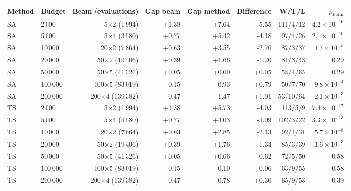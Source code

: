 \begin{tabular}{llrrrrrr}
\toprule
Method & Budget & Beam (evaluations) & Gap beam & Gap method & Difference & W/T/L & $p_{\mathrm{Holm}}$ \\
\midrule
SA & 2\,000 & 5$\times$2 (1\,994) & +1.38 & +7.64 & -5.55 & 111/4/12 & $4.2 \times 10^{-16}$ \\
SA & 5\,000 & 5$\times$4 (3\,580) & +0.77 & +5.42 & -4.18 & 97/4/26 & $2.1 \times 10^{-10}$ \\
SA & 10\,000 & 20$\times$2 (7\,864) & +0.63 & +3.55 & -2.70 & 87/3/37 & $1.7 \times 10^{-5}$ \\
SA & 20\,000 & 50$\times$2 (19\,406) & +0.39 & +1.66 & -1.20 & 81/3/43 & 0.29 \\
SA & 50\,000 & 50$\times$5 (41\,326) & +0.05 & +0.00 & +0.05 & 58/4/65 & 0.29 \\
SA & 100\,000 & 100$\times$5 (83\,019) & -0.15 & -0.93 & +0.79 & 50/7/70 & $9.8 \times 10^{-4}$ \\
SA & 200\,000 & 200$\times$4 (139\,382) & -0.47 & -1.47 & +1.01 & 53/10/64 & $2.1 \times 10^{-3}$ \\
\midrule
TS & 2\,000 & 5$\times$2 (1\,994) & +1.38 & +5.73 & -4.03 & 113/5/9 & $7.4 \times 10^{-17}$ \\
TS & 5\,000 & 5$\times$4 (3\,580) & +0.77 & +4.03 & -3.09 & 102/3/22 & $3.3 \times 10^{-13}$ \\
TS & 10\,000 & 20$\times$2 (7\,864) & +0.63 & +2.85 & -2.13 & 92/4/31 & $5.7 \times 10^{-8}$ \\
TS & 20\,000 & 50$\times$2 (19\,406) & +0.39 & +1.76 & -1.34 & 85/3/39 & $1.6 \times 10^{-3}$ \\
TS & 50\,000 & 50$\times$5 (41\,326) & +0.05 & +0.66 & -0.62 & 72/5/50 & 0.58 \\
TS & 100\,000 & 100$\times$5 (83\,019) & -0.15 & -0.10 & -0.06 & 63/9/55 & 0.58 \\
TS & 200\,000 & 200$\times$4 (139\,382) & -0.47 & -0.78 & +0.30 & 65/9/53 & 0.39 \\
\bottomrule
\end{tabular}
